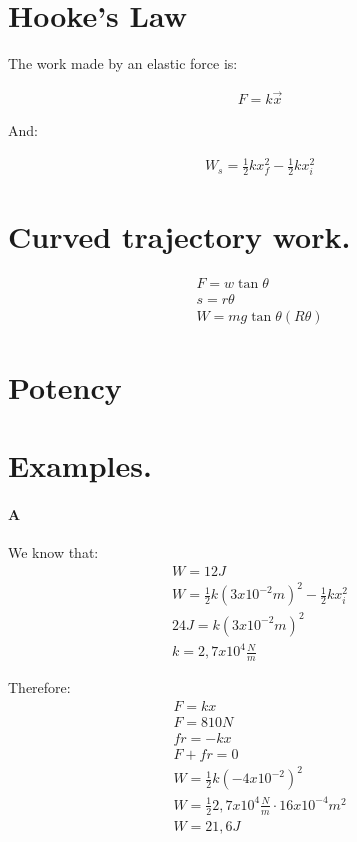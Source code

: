 \documentclass[11pt,fleqn]{book} %
\begin{document}
\section{Hooke's Law}

The work made by an elastic force is:

\begin{gather}
    F = k\vec{x}
\end{gather}

And:

\begin{gather}
W_s = \frac{1}{2}k x_f^2 - \frac{1}{2} k x_i^2
\end{gather}

\section{Curved trajectory work.}

\begin{gather}
    F = w \tan{\theta}\\
    s = r \theta \\
    W = mg \tan{\theta} ( R \theta )
\end{gather}

\section{Potency}

\section{Examples.}

\paragraph{A}

We know that:
\begin{gather}
    W = 12J\\
    W = \frac{1}{2} k (3 x 10^{-2}m)^2 - \frac{1}{2} k x_i^2\\
    24J = k(3 x 10^{-2}m)^2\\
    k = 2,7 x 10^4 \frac{N}{m}
\end{gather}

Therefore:
\begin{gather}
    F = kx\\
    F = 810 N\\
    fr = -kx\\
    F + fr = 0\\
    W = \frac{1}{2} k (-4 x 10^{-2})^2\\
    W = \frac{1}{2} 2,7 x 10^4 \frac{N}{m} \cdot 16 x 10^{-4} m^2\\
    W = 21,6 J 
\end{gather}
\end{document}
